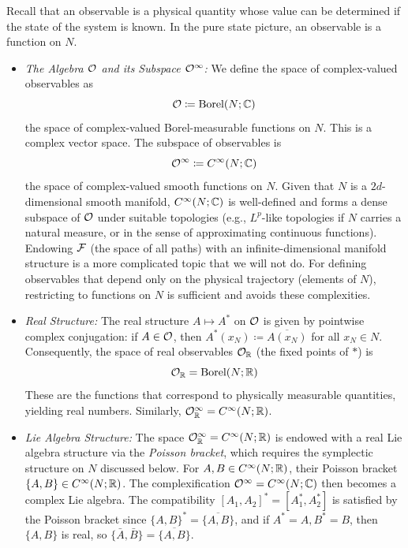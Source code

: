 Recall that an observable is a physical quantity whose value can be determined if the state of the system is known. In the pure state picture, an observable is a function on $N$.
\begin{itemize}
\item \textit{The Algebra $\mathcal{O}$ and its  Subspace $\mathcal{O}^\infty$:} We define the space of complex-valued observables as
\[ \mathcal{O} \coloneqq \text{Borel}(N; \mathbb{C}) \]
the space of complex-valued Borel-measurable functions on $N$. This is a complex vector space. The subspace of  observables is
\[ \mathcal{O}^{\infty} \coloneqq C^{\infty}(N;\mathbb{C}) \]
the space of complex-valued smooth functions on $N$. Given that $N$ is a $2d$-dimensional smooth manifold, $C^\infty(N;\mathbb{C})$ is well-defined and forms a dense subspace of $\mathcal{O}$ under suitable topologies (e.g., $L^p$-like topologies if $N$ carries a natural measure, or in the sense of approximating continuous functions). Endowing $\mathcal{F}$ (the space of all paths) with an infinite-dimensional manifold structure is a more complicated topic that we will not do. For defining observables that depend only on the physical trajectory (elements of $N$), restricting to functions on $N$ is sufficient and avoids these complexities.

\item \textit{Real Structure:} The real structure $A \mapsto A^*$ on $\mathcal{O}$ is given by pointwise complex conjugation: if $A \in \mathcal{O}$, then $A^*(x_N) \coloneqq \overline{A(x_N)}$ for all $x_N \in N$. Consequently, the space of real observables $\mathcal{O}_{\mathbb{R}}$ (the fixed points of $*$) is
\[ \mathcal{O}_{\mathbb{R}} = \text{Borel}(N;\mathbb{R}) \]
These are the functions that correspond to physically measurable quantities, yielding real numbers.
Similarly, $\mathcal{O}^\infty_{\mathbb{R}} = C^\infty(N;\mathbb{R})$.

\item \textit{Lie Algebra Structure:} The space $\mathcal{O}^\infty_{\mathbb{R}} = C^\infty(N;\mathbb{R})$ is endowed with a real Lie algebra structure via the \emph{Poisson bracket}, which requires the symplectic structure on $N$ discussed below. For $A, B \in C^\infty(N;\mathbb{R})$, their Poisson bracket $\{A,B\} \in C^\infty(N;\mathbb{R})$. The complexification $\mathcal{O}^\infty = C^\infty(N;\mathbb{C})$ then becomes a complex Lie algebra. The compatibility $[A_1,A_2]^* = [A_1^*,A_2^*]$ is satisfied by the Poisson bracket since $\{A,B\}^* = \overline{\{A,B\}}$, and if $A^*=A, B^*=B$, then $\{A,B\}$ is real, so $\{\bar{A},\bar{B}\} = \overline{\{A,B\}}$.
\end{itemize}

